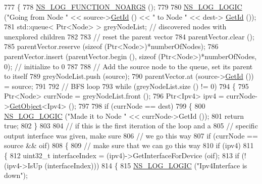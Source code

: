 \begin{DoxyCode}
777 \{
778   \hyperlink{log-macros-disabled_8h_a8f7e4afc291c9d29a65c18ac1f79197b}{NS\_LOG\_FUNCTION\_NOARGS} ();
779 
780   \hyperlink{group__logging_ga88acd260151caf2db9c0fc84997f45ce}{NS\_LOG\_LOGIC} (\textcolor{stringliteral}{"Going from Node "} << source->\hyperlink{classns3_1_1Node_aaf49b64a843565ce3812326313b370ac}{GetId} () << \textcolor{stringliteral}{" to Node "} << dest->
      \hyperlink{classns3_1_1Node_aaf49b64a843565ce3812326313b370ac}{GetId} ());
781   std::queue< Ptr<Node> > greyNodeList;  \textcolor{comment}{// discovered nodes with unexplored children}
782 
783   \textcolor{comment}{// reset the parent vector}
784   parentVector.clear ();
785   parentVector.reserve (\textcolor{keyword}{sizeof} (Ptr<Node>)*numberOfNodes);
786   parentVector.insert (parentVector.begin (), \textcolor{keyword}{sizeof} (Ptr<Node>)*numberOfNodes, 0); \textcolor{comment}{// initialize to 0}
787 
788   \textcolor{comment}{// Add the source node to the queue, set its parent to itself }
789   greyNodeList.push (source);
790   parentVector.at (source->\hyperlink{classns3_1_1Node_aaf49b64a843565ce3812326313b370ac}{GetId} ()) = source;
791 
792   \textcolor{comment}{// BFS loop}
793   \textcolor{keywordflow}{while} (greyNodeList.size () != 0)
794     \{
795       Ptr<Node> currNode = greyNodeList.front ();
796       Ptr<Ipv4> ipv4 = currNode->\hyperlink{classns3_1_1Object_a13e18c00017096c8381eb651d5bd0783}{GetObject}<Ipv4> ();
797  
798       \textcolor{keywordflow}{if} (currNode == dest) 
799         \{
800           \hyperlink{group__logging_ga88acd260151caf2db9c0fc84997f45ce}{NS\_LOG\_LOGIC} (\textcolor{stringliteral}{"Made it to Node "} << currNode->GetId ());
801           \textcolor{keywordflow}{return} \textcolor{keyword}{true};
802         \}
803 
804       \textcolor{comment}{// if this is the first iteration of the loop and a }
805       \textcolor{comment}{// specific output interface was given, make sure }
806       \textcolor{comment}{// we go this way}
807       \textcolor{keywordflow}{if} (currNode == source && oif)
808         \{
809           \textcolor{comment}{// make sure that we can go this way}
810           \textcolor{keywordflow}{if} (ipv4)
811             \{
812               uint32\_t interfaceIndex = (ipv4)->GetInterfaceForDevice (oif);
813               \textcolor{keywordflow}{if} (!(ipv4->IsUp (interfaceIndex)))
814                 \{
815                   \hyperlink{group__logging_ga88acd260151caf2db9c0fc84997f45ce}{NS\_LOG\_LOGIC} (\textcolor{stringliteral}{"Ipv4Interface is down"});

\end{DoxyCode}
